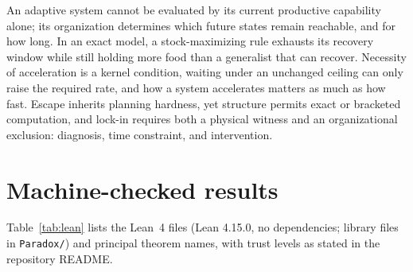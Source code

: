 \documentclass[11pt]{article}
\theoremstyle{plain}
\theoremstyle{definition}
\begin{document}
An adaptive system cannot be evaluated by its current productive capability alone; its organization determines which future states remain reachable, and for how long. In an exact model, a stock-maximizing rule exhausts its recovery window while still holding more food than a generalist that can recover. Necessity of acceleration is a kernel condition, waiting under an unchanged ceiling can only raise the required rate, and how a system accelerates matters as much as how fast. Escape inherits planning hardness, yet structure permits exact or bracketed computation, and lock-in requires both a physical witness and an organizational exclusion: diagnosis, time constraint, and intervention.




\appendix

\section{Machine-checked results}
\label{app:lean}

Table~\ref{tab:lean} lists the Lean~4 files (Lean 4.15.0, no dependencies; library files in \texttt{Paradox/}) and principal theorem names, with trust levels as stated in the repository README.
\end{document}
